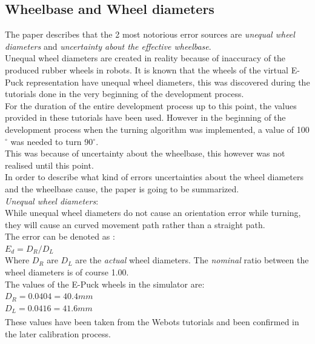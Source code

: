 \subsection{Wheelbase and Wheel diameters}
The paper describes that the 2 most notorious  error sources are \textit{unequal wheel diameters} and \textit{uncertainty about the effective wheelbase}.\\
Unequal wheel diameters are created in reality because of inaccuracy of the produced rubber wheels in robots. It is known that the wheels of the virtual E-Puck representation have unequal wheel diameters, this was discovered during the tutorials done in the very beginning of the development process.\\
For the duration of the entire development process up to this point, the values provided in these tutorials have been used. However in the beginning of the development process when the turning algorithm was implemented, a value of 100$^{\circ}$ was needed to turn 90$^{\circ}$.\\
This was because of uncertainty about the wheelbase, this however was not realised until this point.\\[3ex]

In order to describe what kind of errors uncertainties about the wheel diameters and the wheelbase cause, the paper is going to be summarized. \\[3ex]

\textit{Unequal wheel diameters}:\\
While unequal wheel diameters do not cause an orientation error while turning, they will cause an curved movement path rather than a straight path.\\
The error can be denoted as :\\
$E_{d} = D_{R} / D_{L}$\\
Where $D_{R}$ are $D_{L}$ are the \textit{actual} wheel diameters. The \textit{nominal} ratio between the wheel diameters is of course 1.00\cite{Borenstein1996Measurement}.\\
The values of the E-Puck wheels in the simulator are:\\
$D_{R} = 0.0404 = 40.4mm$\\
$D_{L} = 0.0416 = 41.6mm$\\
These values have been taken from the Webots\textsuperscript{\texttrademark} tutorials and been confirmed in the later calibration process.\\

